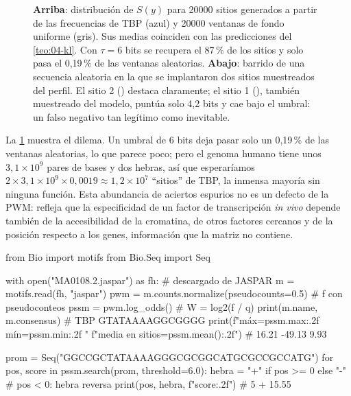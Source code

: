 \begin{figure}[tbp]
\caption[Detección de sitios con una PWM]{\textbf{Arriba}: distribución de $S(y)$ para \num{20000} sitios generados a partir de las frecuencias de TBP (azul) y \num{20000} ventanas de fondo uniforme (gris). Sus medias coinciden con las predicciones del \cref{teo:04-kl}. Con $\tau=6$ bits se recupera el 87\,\% de los sitios y solo pasa el 0,19\,\% de las ventanas aleatorias. \textbf{Abajo}: barrido de una secuencia aleatoria en la que se implantaron dos sitios muestreados del perfil. El sitio 2 () destaca claramente; el sitio 1 (), también muestreado del modelo, puntúa solo 4,2 bits y cae bajo el umbral: un falso negativo tan legítimo como inevitable.}
\label{fig:04-scan}
\end{figure}

La \cref{fig:04-scan} muestra el dilema. Un umbral de 6 bits deja pasar solo un 0,19\,\% de las ventanas aleatorias, lo que parece poco; pero el genoma humano tiene unos $3{,}1\times10^9$ pares de bases y dos hebras, así que esperaríamos $2\times3{,}1\times10^9\times0{,}0019\approx1{,}2\times10^7$ ``sitios'' de TBP, la inmensa mayoría sin ninguna función. Esta abundancia de aciertos espurios no es un defecto de la PWM: refleja que la especificidad de un factor de transcripción \emph{in vivo} depende también de la accesibilidad de la cromatina, de otros factores cercanos y de la posición respecto a los genes, información que la matriz no contiene.

\begin{codigo}
from Bio import motifs
from Bio.Seq import Seq

with open("MA0108.2.jaspar") as fh:            # descargado de JASPAR
    m = motifs.read(fh, "jaspar")
pwm = m.counts.normalize(pseudocounts=0.5)     # f con pseudoconteos
pssm = pwm.log_odds()                          # W = log2(f / q)
print(m.name, m.consensus)                     # TBP GTATAAAAGGCGGGG
print(f"máx={pssm.max:.2f}  mín={pssm.min:.2f}  "
      f"media en sitios={pssm.mean():.2f}")     # 16.21 -49.13 9.93

prom = Seq("GGCCGCTATAAAAGGGCGCGGCATGCGCCGCCATG")
for pos, score in pssm.search(prom, threshold=6.0):
    hebra = "+" if pos >= 0 else "-"           # pos < 0: hebra reversa
    print(pos, hebra, f"{score:.2f}")          # 5 + 15.55
\end{codigo}

